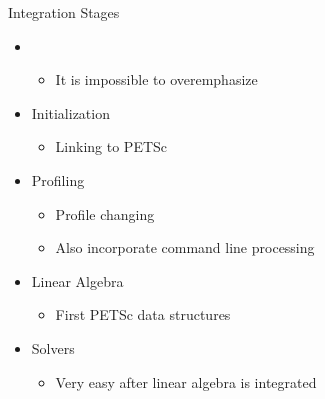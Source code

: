 \begin{frame}{Integration Stages}

\begin{itemize}
  \item {}
  \begin{itemize}
    \item It is impossible to overemphasize
  \end{itemize}

  \item Initialization
  \begin{itemize}
    \item Linking to PETSc
  \end{itemize}

  \item Profiling
  \begin{itemize}
    \item Profile  changing
    \item Also incorporate command line processing
  \end{itemize}

  \item Linear Algebra
  \begin{itemize}
    \item First PETSc data structures
  \end{itemize}

  \item Solvers
  \begin{itemize}
    \item Very easy after linear algebra is integrated
  \end{itemize}
\end{itemize}

\end{frame}
